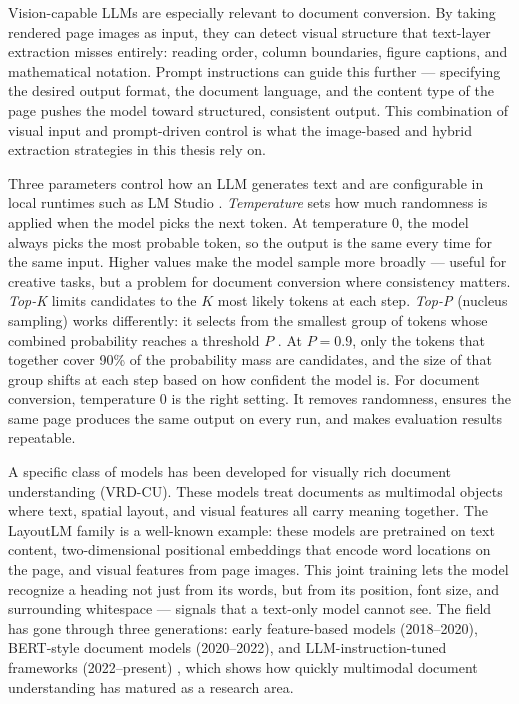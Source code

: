 \documentclass[12pt]{article}
\begin{document}
Vision-capable LLMs are especially relevant to document conversion. By taking
rendered page images as input, they can detect visual structure that text-layer
extraction misses entirely: reading order, column boundaries, figure captions,
and mathematical notation. Prompt instructions can guide this further ---
specifying the desired output format, the document language, and the content
type of the page pushes the model toward structured, consistent output. This
combination of visual input and prompt-driven control is what the image-based
and hybrid extraction strategies in this thesis rely on.

Three parameters control how an LLM generates text and are configurable in
local runtimes such as LM Studio \cite{khan2024}. \textit{Temperature} sets
how much randomness is applied when the model picks the next token. At
temperature 0, the model always picks the most probable token, so the output
is the same every time for the same input. Higher values make the model sample
more broadly --- useful for creative tasks, but a problem for document
conversion where consistency matters. \textit{Top-K} limits candidates to the
$K$ most likely tokens at each step. \textit{Top-P} (nucleus sampling) works
differently: it selects from the smallest group of tokens whose combined
probability reaches a threshold $P$ \cite{khan2024}. At $P = 0.9$, only the
tokens that together cover 90\% of the probability mass are candidates, and
the size of that group shifts at each step based on how confident the model
is. For document conversion, temperature 0 is the right setting. It removes
randomness, ensures the same page produces the same output on every run, and
makes evaluation results repeatable.

A specific class of models has been developed for visually rich document
understanding (VRD-CU). These models treat documents as multimodal objects
where text, spatial layout, and visual features all carry meaning together.
The LayoutLM family \cite{ding2026} is a well-known example: these models are
pretrained on text content, two-dimensional positional embeddings that encode
word locations on the page, and visual features from page images. This joint
training lets the model recognize a heading not just from its words, but from
its position, font size, and surrounding whitespace --- signals that a
text-only model cannot see. The field has gone through three generations:
early feature-based models (2018--2020), BERT-style document models
(2020--2022), and LLM-instruction-tuned frameworks (2022--present)
\cite{ding2026}, which shows how quickly multimodal document understanding
has matured as a research area.
\end{document}
